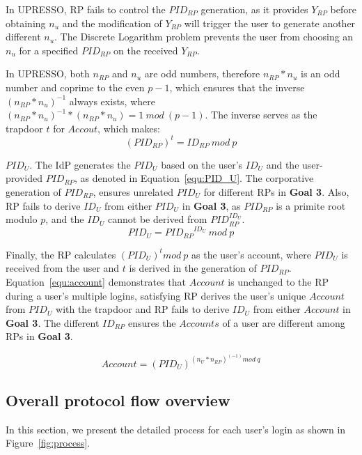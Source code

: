 In UPRESSO, RP fails to control the $PID_{RP}$ generation, as it provides $Y_{RP}$ before obtaining $n_{u}$ and the modification of $Y_{RP}$ will trigger the user to generate another different  $n_{u}$. The Discrete Logarithm problem prevents the user from choosing an $n_{u}$ for a specified $PID_{RP}$ on the received $Y_{RP}$.

In UPRESSO, both $n_{RP}$ and $n_{u}$ are odd numbers, therefore $n_{RP}*n_{u}$ is an odd number and coprime to the even $p-1$, which ensures that the inverse $(n_{RP}*n_{u})^{-1}$ always exists, where  $(n_{RP}*n_{u})^{-1} * (n_{RP}*n_{u}) = 1 \ mod \ (p-1)$. The inverse  serves as  the trapdoor $t$ for $Accout$, which makes:
\begin{equation}
(PID_{RP})^t = ID_{RP} \ mod \ p
\label{equ:trapdoor}
\end{equation}


\noindent\textbf{$PID_U$}. The IdP generates the $PID_U$ based on the user's $ID_U$ and the user-provided $PID_{RP}$, as denoted in Equation~\ref{equ:PID_U}.
The corporative generation of $PID_{RP}$, ensures unrelated $PID_U$  for different RPs in \textbf{Goal 3}. Also, RP fails to derive $ID_U$ from either $PID_U$ in \textbf{Goal 3}, as
   $PID_{RP}$ is a primite root modulo $p$, and the $ID_U$ cannot be derived from $PID_{RP}^{ID_U}$.
\begin{equation}
 PID_U = {PID_{RP}}^{ID_U} \ mod \ p
 \label{equ:PID_U}
\end{equation}

Finally, the RP calculates $(PID_U)^t mod \ p$ as the  user's account, where $PID_U$ is received from the user and $t$ is derived in the generation of $PID_{RP}$. Equation~\ref{equ:account} demonstrates that $Account$ is unchanged to the RP during a user's multiple logins, satisfying RP derives the user's unique $Account$  from $PID_U$ with the  trapdoor and  RP fails to derive $ID_U$ from either $Account$ in \textbf{Goal 3}. The different $ID_{RP}$ ensures the $Accounts$ of a user are different among RPs in \textbf{Goal 3}.

 \begin{equation}
   Account = (PID_U)^{(n_U*n_{RP})^(-1) mod \ q}
   \label{equ:account}
   \end{equation}


\subsection{Overall protocol flow overview}
\label{sebsec:loginprocess}
In this section, we present the detailed process for each user's login as shown in Figure~\ref{fig:process}.

